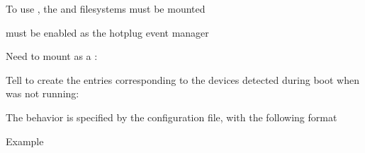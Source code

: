   \startitemize
  \item To use , the  and  filesystems must be mounted
  \item {} must be enabled as the hotplug event manager\\
  \item Need to mount  as a :\\
  \item Tell  to create the  entries
    corresponding to the devices detected
    during boot when  was not running:\\
  \item The behavior is specified by the  configuration
    file, with the following format\\
  \item Example\\
  \stopitemize


